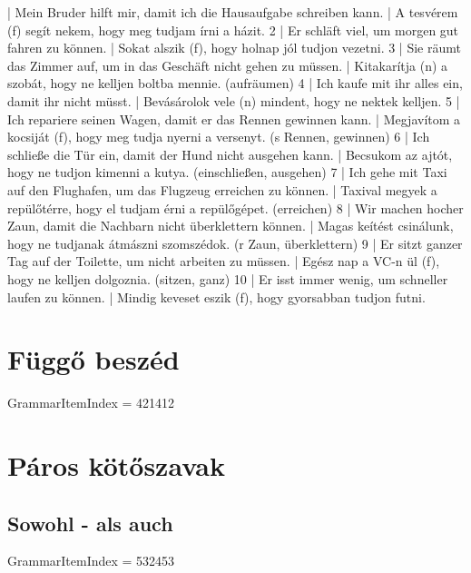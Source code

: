 \documentclass{article}
\newenvironment{desc}{\verbatim}{\endverbatim}
\newenvironment{exmp}{\verbatim}{\endverbatim}
\begin{document}
\begin{exmp}
1 | Mein Bruder hilft mir, damit ich die Hausaufgabe schreiben kann. | A tesvérem (f) segít nekem, hogy meg tudjam írni a házit.
2 | Er schläft viel, um morgen gut fahren zu können. | Sokat alszik (f), hogy holnap jól tudjon vezetni.
3 | Sie räumt das Zimmer auf, um in das Geschäft nicht gehen zu müssen. | Kitakarítja (n) a szobát, hogy ne kelljen boltba mennie. (aufräumen)
4 | Ich kaufe mit ihr alles ein, damit ihr nicht müsst. | Bevásárolok vele (n) mindent, hogy ne nektek kelljen.
5 | Ich repariere seinen Wagen, damit er das Rennen gewinnen kann. | Megjavítom a kocsiját (f), hogy meg tudja nyerni a versenyt. (s Rennen, gewinnen)
6 | Ich schließe die Tür ein, damit der Hund nicht ausgehen kann. | Becsukom az ajtót, hogy ne tudjon kimenni a kutya. (einschließen, ausgehen)
7 | Ich gehe mit Taxi auf den Flughafen, um das Flugzeug erreichen zu können. | Taxival megyek a repülőtérre, hogy el tudjam érni a repülőgépet. (erreichen)
8 | Wir machen hocher Zaun, damit die Nachbarn nicht überklettern können. | Magas keítést csinálunk, hogy ne tudjanak átmászni szomszédok. (r Zaun, überklettern)
9 | Er sitzt ganzer Tag auf der Toilette, um nicht arbeiten zu müssen. | Egész nap a VC-n ül (f), hogy ne kelljen dolgoznia. (sitzen, ganz)
10 | Er isst immer wenig, um schneller laufen zu können. | Mindig keveset eszik (f), hogy gyorsabban tudjon futni.
\end{exmp}

\section{Függő beszéd}

GrammarItemIndex = 421412

\begin{desc}
\end{desc}

\begin{exmp}
\end{exmp}

\section{Páros kötőszavak}

\subsection{Sowohl - als auch}

GrammarItemIndex = 532453
\end{document}
